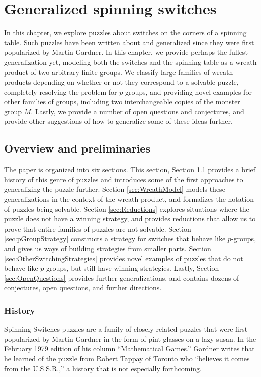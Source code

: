 \chapter{Generalized spinning switches}
\label{cha:SpinningSwitches}

In this chapter, we explore puzzles about switches on the corners of a
spinning table. Such puzzles have been written about and generalized since they
were first popularized by Martin Gardner.
In this chapter, we provide perhaps the fullest generalization yet, modeling
both the switches and the spinning table as a wreath product of two arbitrary
finite groups. We classify large families of wreath products depending on
whether or not they correspond to a solvable puzzle, completely resolving the
problem for $p$-groups, and providing novel examples for other families of
groups, including two interchangeable copies of the monster group $M$.
Lastly, we provide a number of open questions and conjectures, and
provide other suggestions of how to generalize some of these ideas further.

\section{Overview and preliminaries}
\label{sec:overviewAndPreliminaries}
The paper is organized into six sections.
This section,
Section \ref{sec:overviewAndPreliminaries} provides a brief history of this genre of puzzles and introduces some of the first approaches to generalizing the puzzle further.
Section \ref{sec:WreathModel} models these generalizations in the context of the wreath product, and formalizes the notation of puzzles being solvable.
Section \ref{sec:Reductions} explores situations where the puzzle does not have a winning strategy, and provides reductions that allow us to prove that entire families of puzzles are not solvable.
Section \ref{sec:pGroupStrategy} constructs a strategy for switches that behave like $p$-groups, and gives us ways of building strategies from smaller parts.
Section \ref{sec:OtherSwitchingStrategies} provides novel examples of puzzles that do not behave like $p$-groups, but still have winning strategies.
Lastly,
Section \ref{sec:OpenQuestions} provides further generalizations, and contains dozens of conjectures, open questions, and further directions.

\subsection{History}
Spinning Switches puzzles are a family of closely related puzzles
that were first popularized by Martin Gardner in the form of pint glasses
on a lazy susan.
In the February 1979 edition of his column ``Mathematical Games.'' \cite{Gardner1979Problem}
Gardner writes that he learned of the puzzle from Robert Tappay of Toronto who
``believes it comes from the U.S.S.R.,'' a history that is not especially
forthcoming.


